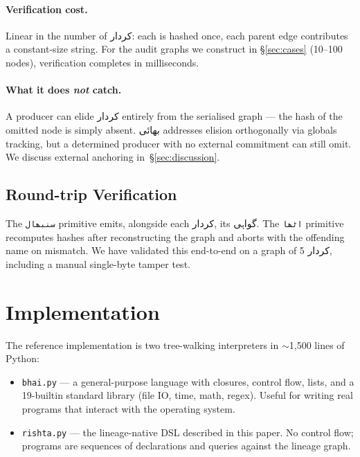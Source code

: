 \documentclass[10pt,twocolumn]{article}
\newcommand{\ur}[1]{{\urdufont #1}}
\begin{document}
\paragraph{Verification cost.} Linear in the number of \ur{کردار}: each is hashed once, each parent edge contributes a constant-size string. For the audit graphs we construct in \S\ref{sec:cases} (10--100 nodes), verification completes in milliseconds.

\paragraph{What it does \emph{not} catch.} A producer can elide \ur{کردار} entirely from the serialised graph — the hash of the omitted node is simply absent. \ur{بھائی} addresses elision orthogonally via globals tracking, but a determined producer with no external commitment can still omit. We discuss external anchoring in~\S\ref{sec:discussion}.

\subsection{Round-trip Verification}

The \texttt{\ur{سنبھال}} primitive emits, alongside each \ur{کردار}, its \ur{گواہی}. The \texttt{\ur{اٹھا}} primitive recomputes hashes after reconstructing the graph and aborts with the offending name on mismatch. We have validated this end-to-end on a graph of 5 \ur{کردار}, including a manual single-byte tamper test.

\section{Implementation}
\label{sec:impl}

The reference implementation is two tree-walking interpreters in $\sim$1{,}500 lines of Python:

\begin{itemize}
\item \texttt{bhai.py} — a general-purpose language with closures, control flow, lists, and a 19-builtin standard library (file IO, time, math, regex). Useful for writing real programs that interact with the operating system.
\item \texttt{rishta.py} — the lineage-native DSL described in this paper. No control flow; programs are sequences of declarations and queries against the lineage graph.
\end{itemize}
\end{document}
